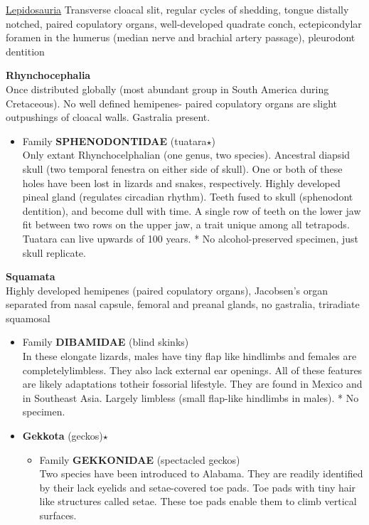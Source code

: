\documentclass[a4paper,12pt]{article}
\begin{document}
\begin{description}
\item{\underline{{\LARGE{Lepidosauria}}}}
Transverse cloacal slit, regular cycles of shedding, tongue distally notched, paired copulatory organs, well-developed quadrate conch, ectepicondylar foramen in the humerus (median nerve and brachial artery passage), pleurodont dentition
\item\textbf{Rhynchocephalia} \\ Once distributed globally (most abundant group in South America during Cretaceous). No well defined hemipenes- paired copulatory organs are slight outpushings of cloacal walls. Gastralia present.
\begin{itemize}
  \item Family {\textbf{SPHENODONTIDAE} (tuatara$\star$)} \\ Only extant Rhynchocelphalian (one genus, two species). Ancestral diapsid skull (two temporal fenestra on either side of skull). One or both of these holes have been lost in lizards and snakes, respectively. Highly developed pineal gland (regulates circadian rhythm). Teeth fused to skull (sphenodont dentition), and become dull with time. A single row of teeth on the lower jaw fit between two rows on the upper jaw, a trait unique among all tetrapods. Tuatara can live upwards of 100 years. * No alcohol-preserved specimen, just skull replicate.
\end{itemize}
\item\textbf{Squamata} \\ Highly developed hemipenes (paired copulatory organs), Jacobsen's organ separated from nasal capsule, femoral and preanal glands, no gastralia, triradiate squamosal
\begin{itemize}
  \item Family {\textbf{DIBAMIDAE} (blind skinks)} \\ In these elongate lizards, males have tiny flap like hindlimbs and females are completelylimbless. They also lack external ear openings. All of these features are likely adaptations totheir fossorial lifestyle. They are found in Mexico and in Southeast Asia. Largely limbless (small flap-like hindlimbs in males). * No specimen.
  \item{\textbf{Gekkota} (geckos)$\star$}
  \begin{itemize}
    \item Family {\textbf{GEKKONIDAE} (spectacled geckos)} \\ Two species have been introduced to Alabama. They are readily identified by their lack eyelids and setae-covered toe pads. Toe pads with tiny hair like structures called setae. These toe pads enable them to climb vertical surfaces.

\end{itemize}
\end{itemize}
\end{description}
\end{document}
